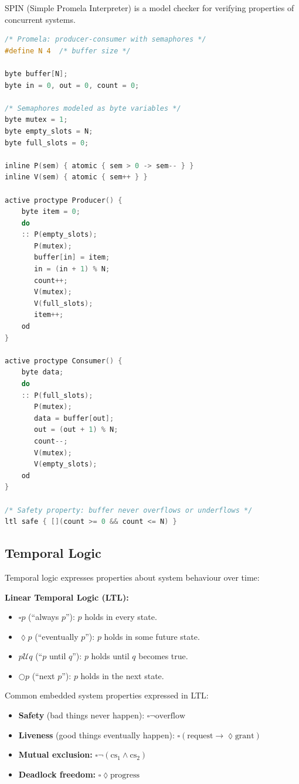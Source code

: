 SPIN (Simple Promela Interpreter) is a model checker for verifying properties of concurrent systems.

\begin{lstlisting}[language=C, style=C, caption={Promela model of a producer-consumer system with bounded buffer.}, label={lst:ana:promela}]
/* Promela: producer-consumer with semaphores */
#define N 4  /* buffer size */

byte buffer[N];
byte in = 0, out = 0, count = 0;

/* Semaphores modeled as byte variables */
byte mutex = 1;
byte empty_slots = N;
byte full_slots = 0;

inline P(sem) { atomic { sem > 0 -> sem-- } }
inline V(sem) { atomic { sem++ } }

active proctype Producer() {
    byte item = 0;
    do
    :: P(empty_slots);
       P(mutex);
       buffer[in] = item;
       in = (in + 1) % N;
       count++;
       V(mutex);
       V(full_slots);
       item++;
    od
}

active proctype Consumer() {
    byte data;
    do
    :: P(full_slots);
       P(mutex);
       data = buffer[out];
       out = (out + 1) % N;
       count--;
       V(mutex);
       V(empty_slots);
    od
}

/* Safety property: buffer never overflows or underflows */
ltl safe { [](count >= 0 && count <= N) }
\end{lstlisting}

\subsection{Temporal Logic}

Temporal logic expresses properties about system behaviour over time:

\textbf{Linear Temporal Logic (LTL):}
\begin{itemize}[nosep]
  \item $\square p$ (``always $p$''): $p$ holds in every state.
  \item $\lozenge p$ (``eventually $p$''): $p$ holds in some future state.
  \item $p \mathbin{\mathcal{U}} q$ (``$p$ until $q$''): $p$ holds until $q$ becomes true.
  \item $\bigcirc p$ (``next $p$''): $p$ holds in the next state.
\end{itemize}

Common embedded system properties expressed in LTL:
\begin{itemize}[nosep]
  \item \textbf{Safety} (bad things never happen): $\square \neg \text{overflow}$
  \item \textbf{Liveness} (good things eventually happen): $\square(\text{request} \rightarrow \lozenge \text{grant})$
  \item \textbf{Mutual exclusion:} $\square \neg (\text{cs}_1 \land \text{cs}_2)$
  \item \textbf{Deadlock freedom:} $\square \lozenge \text{progress}$
\end{itemize}

